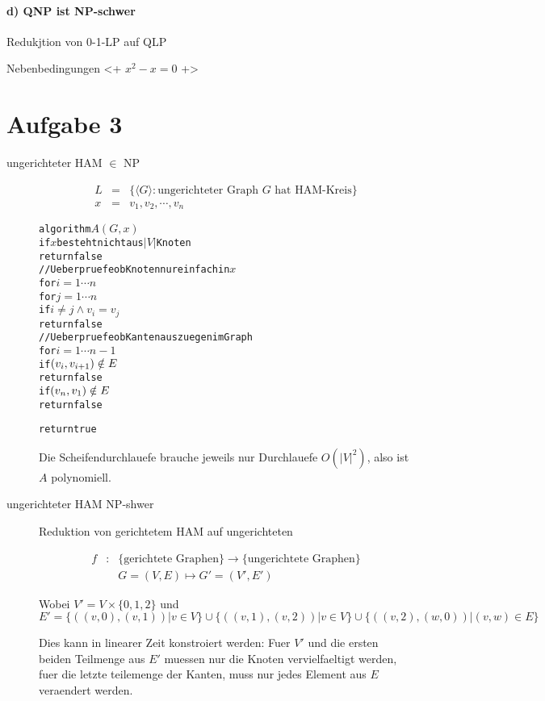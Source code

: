 \paragraph{d) QNP ist NP-schwer} Redukjtion von 0-1-LP auf QLP

Nebenbedingungen <+ $x^2 - x = 0$ +>

\section*{Aufgabe 3}
\begin{description}
\item[ungerichteter HAM $\in$ NP]

\begin{eqnarray}
L &=& \{ \langle G \rangle: \text{ungerichteter Graph $G$ hat HAM-Kreis} \}  \\
x &=& v_1,v_2,\cdots,v_n
\end{eqnarray}

\begin{alltt}
algorithm \(A(G,x)\)
    if \(x\) besteht nicht aus \(|V|\) Knoten
        return false
    // Ueberpruefe ob Knoten nur einfach in \(x\) 
    for \(i = 1 \cdots n\)
        for \(j = 1 \cdots n\)
            if \(i\neq j \land v_i = v_j\)
                return false
    // Ueberpruefe ob Kanten aus zuegen im Graph
    for \(i = 1 \cdots n-1\)
        if \((v\sb{i},v\sb{i+1}) \notin E\)
            return false
    if \((v\sb{n},v\sb{1}) \notin E\)
        return false

    return true
\end{alltt}

Die Scheifendurchlauefe brauche jeweils nur Durchlauefe $O(|V|^2)$,
also ist $A$ polynomiell.


\item[ungerichteter HAM NP-shwer] Reduktion von gerichtetem HAM auf ungerichteten

\begin{eqnarray}
f &:& \{\text{gerichtete Graphen}\} \to \{\text{ungerichtete Graphen}\} \\
  && G=(V,E) \mapsto G'=(V',E')
\end{eqnarray}

Wobei $V' = V\times \{0,1,2\}$ und 
$E' = \{ ( (v,0), (v,1) ) | v \in V \} \cup
      \{ ( (v,1), (v,2) ) | v \in V \} \cup 
      \{ ( (v,2), (w,0) ) | (v,w) \in E \}$

Dies kann in linearer Zeit konstroiert werden: Fuer $V'$ und die ersten beiden Teilmenge aus $E'$
muessen nur die Knoten vervielfaeltigt werden, fuer die letzte teilemenge der Kanten, muss 
nur jedes Element aus $E$ veraendert werden.


\end{description}

